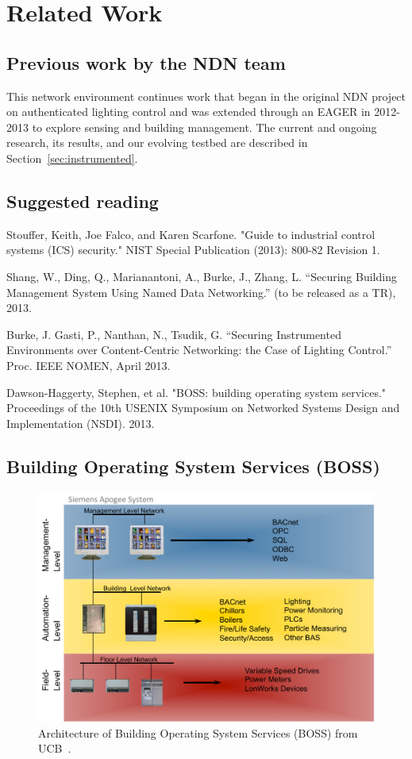 \section{Related Work}

\subsection{Previous work by the NDN team}

This network environment continues work that began in the original NDN project on authenticated lighting control and was extended through an EAGER in 2012-2013 to explore sensing and building management.  The current and ongoing research, its results, and our evolving testbed are described in Section~\ref{sec:instrumented}.  

\subsection{Suggested reading}

Stouffer, Keith, Joe Falco, and Karen Scarfone. "Guide to industrial control systems (ICS) security." NIST Special Publication (2013): 800-82 Revision 1.

Shang, W., Ding, Q., Marianantoni, A., Burke, J., Zhang, L. “Securing Building Management System Using Named Data Networking.”  (to be 
released as a TR), 2013. 

Burke, J. Gasti, P., Nanthan, N., Tsudik, G. “Securing Instrumented Environments over Content-Centric Networking: the Case of Lighting Control.”  Proc. IEEE NOMEN, April 2013. 

Dawson-Haggerty, Stephen, et al. "BOSS: building operating system services." Proceedings of the 10th USENIX Symposium on Networked Systems Design and Implementation (NSDI). 2013.

\subsection{Building Operating System Services (BOSS)} 

\begin{figure}
\begin{center}
\includegraphics[width=.6\textwidth]{figures/siemens-apogee-levels}
\caption{Architecture of Building Operating System Services (BOSS) from UCB~\cite{Dawson-Haggerty2013BOSS}.} 
\label{fig:BOSS}
\end{center}
\end{figure}

